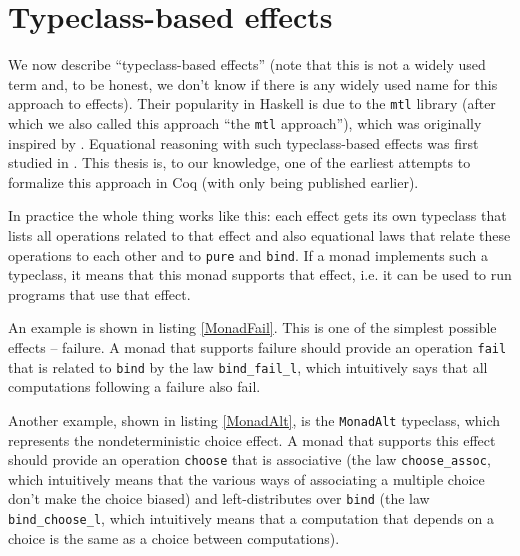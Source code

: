 \documentclass[declaration,inz,english,shortabstract]{iithesis}
\newcommand{\m}[1]{\texttt{#1}}
\begin{document}
\section{Typeclass-based effects}

We now describe ``typeclass-based effects'' (note that this is not a widely used term and, to be honest, we don't know if there is any widely used name for this approach to effects). Their popularity in Haskell is due to the \m{mtl} library (after which we also called this approach ``the \m{mtl} approach''), which was originally inspired by \cite{mtl}. Equational reasoning with such typeclass-based effects was first studied in \cite{JustDoIt}. This thesis is, to our knowledge, one of the earliest attempts to formalize this approach in Coq (with only \cite{MERC} being published earlier).


In practice the whole thing works like this: each effect gets its own typeclass that lists all operations related to that effect and also equational laws that relate these operations to each other and to \m{pure} and \m{bind}. If a monad implements such a typeclass, it means that this monad supports that effect, i.e. it can be used to run programs that use that effect.

An example is shown in listing \ref{MonadFail}. This is one of the simplest possible effects -- failure. A monad that supports failure should provide an operation \m{fail} that is related to \m{bind} by the law \m{bind\_fail\_l}, which intuitively says that all computations following a failure also fail.


Another example, shown in listing \ref{MonadAlt}, is the \m{MonadAlt} typeclass, which represents the nondeterministic choice effect. A monad that supports this effect should provide an operation \m{choose} that is associative (the law \m{choose\_assoc}, which intuitively means that the various ways of associating a multiple choice don't make the choice biased) and left-distributes over \m{bind} (the law \m{bind\_choose\_l}, which intuitively means that a computation that depends on a choice is the same as a choice between computations).
\end{document}
